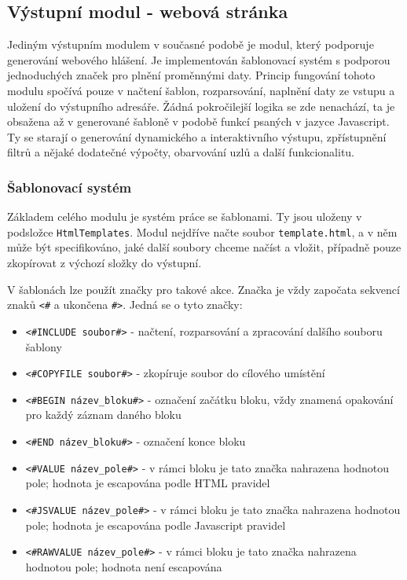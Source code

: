 \documentclass[czech,BP]{thesiskiv}
\begin{document}
\subsection{Výstupní modul - webová stránka}

Jediným výstupním modulem v současné podobě je modul, který podporuje generování webového hlášení. Je implementován šablonovací systém s podporou jednoduchých značek pro plnění proměnnými daty. Princip fungování tohoto modulu spočívá pouze v načtení šablon, rozparsování, naplnění daty ze vstupu a uložení do výstupního adresáře. Žádná pokročilejší logika se zde nenachází, ta je obsažena až v generované šabloně v podobě funkcí psaných v jazyce Javascript. Ty se starají o generování dynamického a interaktivního výstupu, zpřístupnění filtrů a nějaké dodatečné výpočty, obarvování uzlů a další funkcionalitu.

\subsubsection*{Šablonovací systém}

Základem celého modulu je systém práce se šablonami. Ty jsou uloženy v podsložce \texttt{HtmlTemplates}. Modul nejdříve načte soubor \texttt{template.html}, a v něm může být specifikováno, jaké další soubory chceme načíst a vložit, případně pouze zkopírovat z výchozí složky do výstupní.

V šablonách lze použít značky pro takové akce. Značka je vždy započata sekvencí znaků \texttt{<\#} a ukončena \texttt{\#>}. Jedná se o tyto značky:

\begin{itemize}
\item \texttt{<\#INCLUDE soubor\#>} - načtení, rozparsování a zpracování dalšího souboru šablony
\item \texttt{<\#COPYFILE soubor\#>} - zkopíruje soubor do cílového umístění
\item \texttt{<\#BEGIN název\_bloku\#>} - označení začátku bloku, vždy znamená opakování pro každý záznam daného bloku
\item \texttt{<\#END název\_bloku\#>} - označení konce bloku
\item \texttt{<\#VALUE název\_pole\#>} - v rámci bloku je tato značka nahrazena hodnotou pole; hodnota je escapována podle HTML pravidel
\item \texttt{<\#JSVALUE název\_pole\#>} - v rámci bloku je tato značka nahrazena hodnotou pole; hodnota je escapována podle Javascript pravidel
\item \texttt{<\#RAWVALUE název\_pole\#>} - v rámci bloku je tato značka nahrazena hodnotou pole; hodnota není escapována
\end{itemize}
\end{document}
